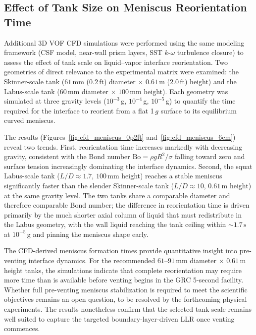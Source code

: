 \documentclass[conf]{new-aiaa}
\begin{document}
\subsection{Effect of Tank Size on Meniscus Reorientation Time}

Additional 3D VOF CFD simulations were performed using the same modeling framework (CSF model, near-wall prism layers, SST $k$-$\omega$ turbulence closure) to assess the effect of tank scale on liquid--vapor interface reorientation. Two geometries of direct relevance to the experimental matrix were examined: the Skinner-scale tank ($61\,\text{mm}$ ($0.2\,\text{ft}$) diameter $\times$ $0.61\,\text{m}$ ($2.0\,\text{ft}$) height) and the Labus-scale tank ($60\,\text{mm}$ diameter $\times$ $100\,\text{mm}$ height). Each geometry was simulated at three gravity levels ($10^{-3}\,$g, $10^{-4}\,$g, $10^{-5}\,$g) to quantify the time required for the interface to reorient from a flat 1\,$g$ surface to its equilibrium curved meniscus.

The results (Figures~\ref{fig:cfd_meniscus_0p2ft} and~\ref{fig:cfd_meniscus_6cm}) reveal two trends. First, reorientation time increases markedly with decreasing gravity, consistent with the Bond number $\mathrm{Bo} = \rho g R^2 / \sigma$ falling toward zero and surface tension increasingly dominating the interface dynamics. Second, the squat Labus-scale tank ($L/D \approx 1.7$, $100\,\text{mm}$ height) reaches a stable meniscus significantly faster than the slender Skinner-scale tank ($L/D \approx 10$, $0.61\,\text{m}$ height) at the same gravity level. The two tanks share a comparable diameter and therefore comparable Bond number; the difference in reorientation time is driven primarily by the much shorter axial column of liquid that must redistribute in the Labus geometry, with the wall liquid reaching the tank ceiling within $\sim 1.7\,\text{s}$ at $10^{-5}\,$g and pinning the meniscus shape early.

The CFD-derived meniscus formation times provide quantitative insight into pre-venting interface dynamics. For the recommended $61$--$91\,\text{mm}$ diameter $\times$ $0.61\,\text{m}$ height tanks, the simulations indicate that complete reorientation may require more time than is available before venting begins in the GRC 5-second facility. Whether full pre-venting meniscus stabilization is required to meet the scientific objectives remains an open question, to be resolved by the forthcoming physical experiments. The results nonetheless confirm that the selected tank scale remains well suited to capture the targeted boundary-layer-driven LLR once venting commences.
\end{document}
